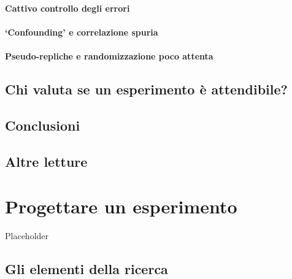 \documentclass[a4paper,12pt,oneside]{book}
\begin{document}
\hypertarget{cattivo-controllo-degli-errori}{%
\subsubsection{Cattivo controllo degli errori}\label{cattivo-controllo-degli-errori}}

\hypertarget{confounding-e-correlazione-spuria}{%
\subsubsection{`Confounding' e correlazione spuria}\label{confounding-e-correlazione-spuria}}

\hypertarget{pseudo-repliche-e-randomizzazione-poco-attenta}{%
\subsubsection{Pseudo-repliche e randomizzazione poco attenta}\label{pseudo-repliche-e-randomizzazione-poco-attenta}}

\hypertarget{chi-valuta-se-un-esperimento-uxe8-attendibile}{%
\section{Chi valuta se un esperimento è attendibile?}\label{chi-valuta-se-un-esperimento-uxe8-attendibile}}

\hypertarget{conclusioni}{%
\section{Conclusioni}\label{conclusioni}}

\hypertarget{altre-letture}{%
\section{Altre letture}\label{altre-letture}}

\hypertarget{progettare-un-esperimento}{%
\chapter{Progettare un esperimento}\label{progettare-un-esperimento}}

Placeholder

\hypertarget{gli-elementi-della-ricerca}{%
\section{Gli elementi della ricerca}\label{gli-elementi-della-ricerca}}
\end{document}
